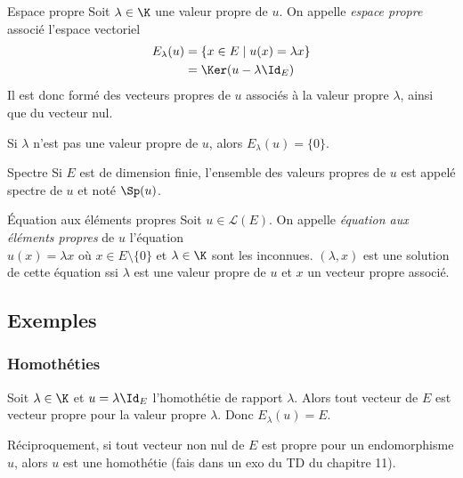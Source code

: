 \begin{definition}{Espace propre}{}
    Soit $\lambda \in \K$ une valeur propre de $u$. On appelle \emph{espace propre} 
    associé l'espace vectoriel 
    \begin{align} E_\lambda(u) & = \{ x \in E \mid u(x) = \lambda x \} \\
                        & = \Ker (u - \lambda \Id_E) 
    \end{align}
    Il est donc formé des vecteurs propres de $u$ associés à la valeur propre $\lambda$,
    ainsi que du vecteur nul.
\end{definition}

\begin{remarque}
    Si $\lambda$ n'est pas une valeur propre de $u$, alors $E_\lambda(u) = \{0\}$.
\end{remarque}

\begin{definition}{Spectre}{}
    Si $E$ est de dimension finie, l'ensemble des valeurs propres de $u$ est appelé spectre de $u$ 
    et noté $\Sp(u)$.
\end{definition}

\begin{definition}{Équation aux éléments propres}{}
    Soit $u \in \mathscr L(E)$. On appelle \emph{équation aux éléments propres} de $u$
    l'équation \\ 
    $u(x) = \lambda x$ où $x \in E \setminus \{0\}$ et $\lambda \in \K$ sont 
    les inconnues. $(\lambda, x)$ est une solution de cette équation ssi $\lambda$ est une valeur propre 
    de $u$ et $x$ un vecteur propre associé.
\end{definition}

\subsection{Exemples}
\subsubsection{Homothéties}

\begin{exemple}
    Soit $\lambda \in \K$ et $u = \lambda \Id_E$ l'homothétie de rapport $\lambda$. 
    Alors tout vecteur de $E$ est vecteur propre pour la valeur propre $\lambda$.
    Donc $E_\lambda(u) = E$.

    \avspace Réciproquement, si tout vecteur non nul de $E$ est propre pour un endomorphisme $u$, 
    alors $u$ est une homothétie (fais dans un exo du TD du chapitre 11).
\end{exemple}

